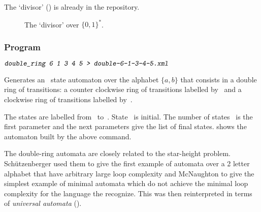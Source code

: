 \Comt
The `divisor'  () is already in the
repository.

\begin{figure}[ht]
    \centering
    \caption{The `divisor'  over
    $\{0,1\}^{*}$. }
\label{fig:div-3b2}
\end{figure}

\subsubsection{Program }
\SetTwClPrm{\TwClThree}%


\begin{SwClCmd}
\begin{shell}
$ \textsl{\texttt{double\_ring 6 1 3 4 5 > double-6-1-3-4-5.xml}}
$
\end{shell}%
\end{SwClCmd}%
\begin{SwClTxt}
    Generates an~ state automaton over the alphabet $\{a,b\}$
    that consists in a double ring of transitions: a counter
    clockwise ring of transitions labelled by~ and a clockwise
    ring of transitions labelled by~.
\end{SwClTxt}%

\Spec
The states are labelled from~ to~.
State~ is initial.
The number of states~ is the first parameter and the next
parameters give the list of final states.
 shows the automaton built by the above command.

\Comt
The double-ring automata are closely related to the star-height
problem.
Sch\"utzenberger used them to give the first example of automata over
a 2 letter alphabet that have arbitrary large loop complexity and
McNaughton to give the simplest example of minimal automata which do
not achieve the minimal loop complexity for the language the recognize.
This was then reinterpreted in terms of \emph{universal automata}
(\cf \cite[Sec.~II.8]{Saka03}).

